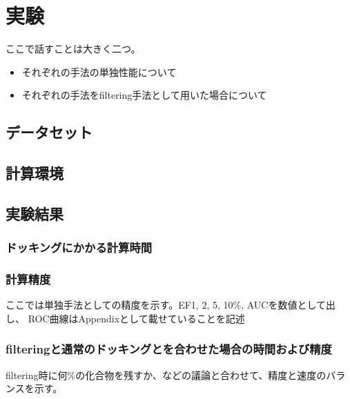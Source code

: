 \chapter{実験}
ここで話すことは大きく二つ。
\begin{itemize}
\item それぞれの手法の単独性能について
\item それぞれの手法をfiltering手法として用いた場合について
\end{itemize}
\section{データセット}
\section{計算環境}
\section{実験結果}
\subsection{ドッキングにかかる計算時間}
\subsection{計算精度}
ここでは単独手法としての精度を示す。EF1, 2, 5, 10\%, AUCを数値として出し、
ROC曲線はAppendixとして載せていることを記述
\subsection{filteringと通常のドッキングとを合わせた場合の時間および精度}
filtering時に何\%の化合物を残すか、などの議論と合わせて、精度と速度のバランスを示す。
